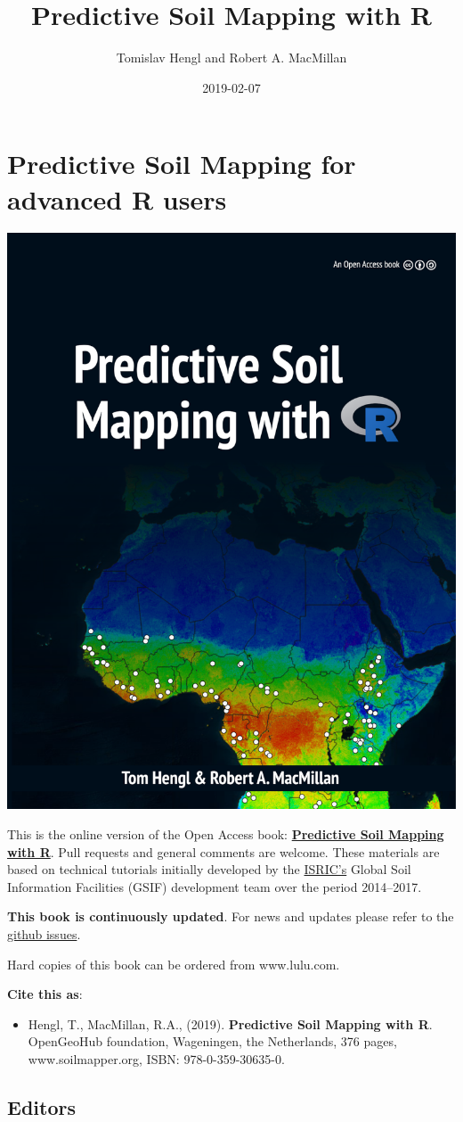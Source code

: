 \documentclass[graybox,natbib,nospthms]{svmono}
\title{Predictive Soil Mapping with R}
\author{Tomislav Hengl and Robert A. MacMillan}
\date{2019-02-07}
\providecommand{\tightlist}{%
  \setlength{\itemsep}{0pt}\setlength{\parskip}{0pt}}
\begin{document}
\maketitle

\section*{Predictive Soil Mapping for advanced R
users}\label{predictive-soil-mapping-for-advanced-r-users}

\includegraphics[width=0.33\linewidth]{figures/f0_web}

This is the online version of the Open Access book:
\href{https://envirometrix.github.io/PredictiveSoilMapping/}{\textbf{Predictive
Soil Mapping with R}}. Pull requests and general comments are welcome.
These materials are based on technical tutorials initially developed by
the \href{http://isric.org/}{ISRIC's} Global Soil Information Facilities
(GSIF) development team over the period 2014--2017.

\textbf{This book is continuously updated}. For news and updates please
refer to the
\href{https://github.com/envirometrix/PredictiveSoilMapping/issues}{github
issues}.

Hard copies of this book can be ordered from www.lulu.com.

\textbf{Cite this as}:

\begin{itemize}
\tightlist
\item
  Hengl, T., MacMillan, R.A., (2019). \textbf{Predictive Soil Mapping
  with R}. OpenGeoHub foundation, Wageningen, the Netherlands, 376
  pages, www.soilmapper.org, ISBN: 978-0-359-30635-0.
\end{itemize}

\subsection*{Editors}\label{editors}
\end{document}

